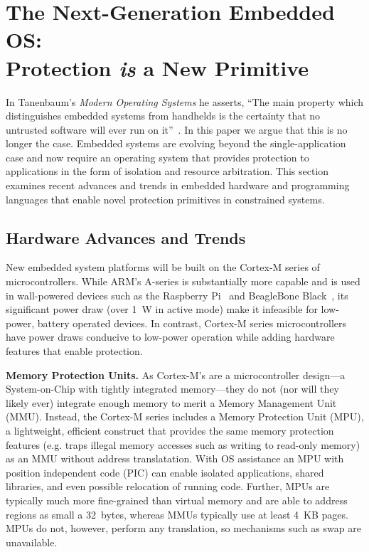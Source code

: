 \section{The Next-Generation Embedded OS:\\Protection \emph{is} a New Primitive}
\label{protection}

In Tanenbaum's \emph{Modern Operating Systems} he asserts, ``The main property
which distinguishes embedded systems from handhelds is the certainty that no
untrusted software will ever run on it''~\cite{tanenbaum}. In this paper we
argue that this is no longer the case. Embedded systems are evolving beyond the
single-application case and now require an operating system that provides
protection to applications in the form of isolation and resource arbitration.
%
This section examines recent advances and trends in embedded hardware and
programming languages that enable novel protection primitives in constrained
systems.

\subsection{Hardware Advances and Trends}

New embedded system platforms will be built on the Cortex-M series of microcontrollers.
While ARM's A-series is substantially more capable and is used in wall-powered
devices such as the Raspberry Pi~\cite{rpi} and BeagleBone Black~\cite{bbb},
its significant power draw (over 1~W in active mode) make it infeasible for
low-power, battery operated devices.
In contrast, Cortex-M series microcontrollers have power draws conducive to
low-power operation while adding hardware features that enable protection.



{\bf Memory Protection Units.}
As Cortex-M's are a microcontroller design---a System-on-Chip with tightly
integrated memory---they do not (nor will they likely ever) integrate enough
memory to merit a Memory Management Unit (MMU). Instead, the Cortex-M series
includes a Memory Protection Unit (MPU), a lightweight, efficient construct
that provides the same memory protection features (e.g. traps illegal memory
accesses such as writing to read-only memory) as an MMU without address
translatation.
With OS assistance an MPU
with position independent code (PIC) can enable isolated applications, shared
libraries, and even possible relocation of running code.
Further, MPUs are typically much more fine-grained than
virtual memory and are able to address regions as small a 32~bytes, whereas MMUs
typically use at least 4~KB pages.
MPUs do not, however, perform any translation, so mechanisms such as swap are unavailable.

